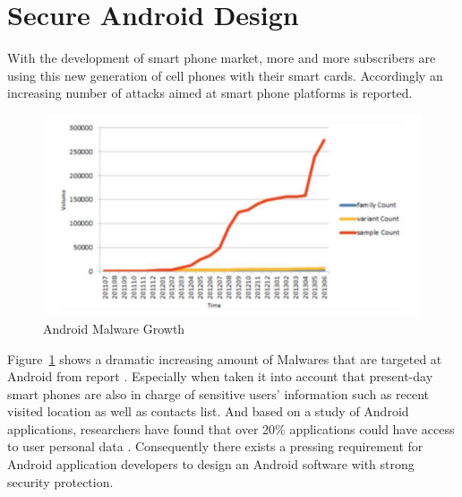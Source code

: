 \section{Secure Android Design}
With the development of smart phone market, more and more subscribers are using this new generation of cell phones with their smart cards. Accordingly an increasing number of attacks aimed at smart phone platforms is reported. 

 \begin{figure}[!htb]
	\centering
	\includegraphics[width=1.0\textwidth]{malware1.pdf}
		\caption{Android Malware Growth \cite{malware}}
	\label{fig:android-malware}
\end{figure}

Figure~\ref{fig:android-malware} shows a dramatic increasing amount of Malwares that are targeted at Android from report \cite{malware}. Especially when taken it into account that present-day smart phones are also in charge of sensitive users' information such as recent visited location as well as contacts list.  And based on a study of Android applications, researchers have found that over 20\% applications could have access to user personal data \cite{android_secure_design}. Consequently there exists a pressing requirement for Android application developers to design an Android software with strong security protection. 

